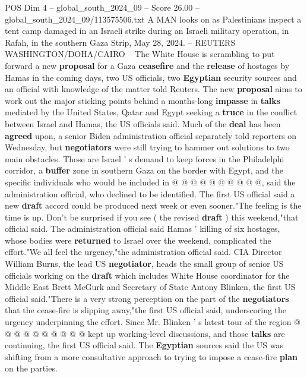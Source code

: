 \begin{textsample}{POS Dim 4 – global\_south\_2024\_09 – Score 26.00 – global\_south\_2024\_09/113575506.txt}  \label{ex:f4_pos_272}
A MAN looks on as Palestinians inspect a tent camp damaged in an Israeli strike during an Israeli military operation, in Rafah, in the southern Gaza Strip, May 28, 2024. -- REUTERS WASHINGTON/DOHA/CAIRO -- The White House is scrambling to put forward a new \textbf{proposal} for a Gaza \textbf{ceasefire} and the \textbf{release} of hostages by Hamas in the coming days, two US officials, two \textbf{Egyptian} security sources and an official with knowledge of the matter told Reuters.
The new \textbf{proposal} aims to work out the major sticking points behind a months-long \textbf{impasse} in \textbf{talks} mediated by the United States, Qatar and Egypt seeking a \textbf{truce} in the conflict between Israel and Hamas, the US officials said.
Much of the \textbf{deal} has been \textbf{agreed} upon, a senior Biden administration official separately told reporters on Wednesday, but \textbf{negotiators} were still trying to hammer out solutions to two main obstacles.
Those are Israel ' s demand to keep forces in the Philadelphi corridor, a \textbf{buffer} zone in southern Gaza on the border with Egypt, and the specific individuals who would be included in @ @ @ @ @ @ @ @ @ @, said the administration official, who declined to be identified.
The first US official said a new \textbf{draft} accord could be produced next week or even sooner."The feeling is the time is up.
Don't be surprised if you see ( the revised \textbf{draft} ) this weekend,"that official said.
The administration official said Hamas ' killing of six hostages, whose bodies were \textbf{returned} to Israel over the weekend, complicated the effort."We all feel the urgency,"the administration official said.
CIA Director William Burns, the lead US \textbf{negotiator}, heads the small group of senior US officials working on the \textbf{draft} which includes White House coordinator for the Middle East Brett McGurk and Secretary of State Antony Blinken, the first US official said."There is a very strong perception on the part of the \textbf{negotiators} that the cease-fire is slipping away,"the first US official said, underscoring the urgency underpinning the effort.
Since Mr.
Blinken ' s latest tour of the region @ @ @ @ @ @ @ @ @ @ kept up working-level discussions, and those \textbf{talks} are continuing, the first US official said.
The \textbf{Egyptian} sources said the US was shifting from a more consultative approach to trying to impose a cease-fire \textbf{plan} on the parties.

\end{textsample}
